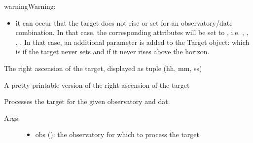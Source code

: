 \documentclass[letterpaper,10pt,english]{sphinxmanual}
\begin{document}
\begin{fulllineitems}
\begin{fulllineitems}
\begin{description}
\end{description}

\begin{notice}{warning}{Warning:}\begin{itemize}
\item {} 
it can occur that the target does not rise or set for an observatory/date combination. In that case, the corresponding attributes will be set to , i.e. , , , . In that case, an additional parameter is added to the Target object:  which is  if the target never sets and  if it never rises above the horizon.

\end{itemize}
\end{notice}

\end{fulllineitems}


\begin{fulllineitems}
\label{astroobs:astroobs.Target.ra}
The right ascension of the target, displayed as tuple (hh, mm, ss)

\end{fulllineitems}


\begin{fulllineitems}
\label{astroobs:astroobs.Target.raStr}
A pretty printable version of the right ascension of the target

\end{fulllineitems}


\begin{fulllineitems}
\label{astroobs:astroobs.Target.whenobs}
Processes the target for the given observatory and dat.
\begin{description}
\item[{Args:}] \leavevmode\begin{itemize}
\item {} 
obs (): the observatory for which to process the target


\end{itemize}
\end{description}
\end{fulllineitems}
\end{fulllineitems}
\end{document}
